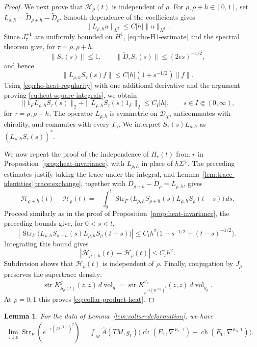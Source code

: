 \documentclass[12pt,reqno]{amsart}
\numberwithin{equation}{section}
\newtheorem{lemma}[theorem]{Lemma}
\theoremstyle{definition}
\newcommand{\Ahat}{\widehat A}
\newcommand{\ch}{\operatorname{ch}}
\newcommand{\Str}{\operatorname{Str}}
\newcommand{\str}{\operatorname{str}}
\begin{document}
\begin{proof}
We next prove that $\mathscr H_\rho(t)$ is independent of $\rho$.
For $\rho,\rho+h\in[0,1]$, set $L_{\rho,h}=\widetilde D_{\rho+h}-\widetilde D_\rho$.
Smooth dependence of the coefficients gives
\[
 \|L_{\rho,h}u\|_{L^2}
 \leq C|h|\|u\|_{H^1}.
\]
Since $J_\tau^{\pm1}$ are uniformly bounded on $H^1$,
\eqref{eq:rho-H1-estimate} and the spectral theorem give, for
$\tau=\rho,\rho+h$,
\[
 \|S_\tau(s)\|\leq1,\qquad
 \|\widetilde D_\tau S_\tau(s)\|
 \leq(2es)^{-1/2},
\]
and hence
\[
 \|L_{\rho,h}S_\tau(s)f\|
 \leq C|h|(1+s^{-1/2})\|f\|.
\]
Using \eqref{eq:rho-heat-regularity} with one additional derivative
and the argument proving \eqref{eq:heat-square-integrals}, we obtain
\[
 \|1_FL_{\rho,h}S_\tau(s)\|_2
 +\|L_{\rho,h}S_\tau(s)1_F\|_2
 \leq C_I|h|,
 \qquad s\in I\Subset(0,\infty),
\]
for $\tau=\rho,\rho+h$.  The operator $L_{\rho,h}$ is symmetric on
$\mathcal D_\chi$, anticommutes with chirality, and commutes with every
$T_\gamma$. We interpret $S_\tau(s)L_{\rho,h}$ as
$(L_{\rho,h}S_\tau(s))^*$.

We now repeat the proof of the independence of $H_r(t)$ from $r$ in
Proposition~\ref{prop:heat-invariance}, with $L_{\rho,h}$ in place of
$h\Sigma^\psi$.  The preceding estimates justify taking the trace
under the integral, and
Lemma~\ref{lem:trace-identities}\ref{trace:exchange}, together with
$\widetilde D_{\rho+h}-\widetilde D_\rho=L_{\rho,h}$, gives
\[
 \mathscr H_{\rho+h}(t)-\mathscr H_\rho(t)
 =-\int_0^t\Str_F\bigl(
 L_{\rho,h}S_{\rho+h}(s)L_{\rho,h}S_\rho(t-s)\bigr)\,ds.
\]
Proceed similarly as in the proof of Proposition~\ref{prop:heat-invariance}, the preceding bounds give, for $0<s<t$,
\[
 \left|\Str_F\bigl(
 L_{\rho,h}S_{\rho+h}(s)L_{\rho,h}S_\rho(t-s)\bigr)\right|
 \leq C_t h^2\bigl(1+s^{-1/2}+(t-s)^{-1/2}\bigr).
\]
Integrating this bound gives
\[
 |\mathscr H_{\rho+h}(t)-\mathscr H_\rho(t)|
 \leq C_t h^2.
\]
Subdivision shows that $\mathscr H_\rho(t)$ is independent of $\rho$.
Finally, conjugation by $J_\rho$ preserves the supertrace density:
\[
 \str K_{S_\rho(t)}^g(z,z)\,d\operatorname{vol}_g
 =\str K_{e^{-t(D^{(\rho)})^2}}^{g_\rho}(z,z)
       \,d\operatorname{vol}_{g_\rho}.
\]
At $\rho=0,1$ this proves \eqref{eq:collar-product-heat}.
\end{proof}

\begin{lemma}\label{lem:doubled-local-formula}
For the data of Lemma~\ref{lem:collar-deformation}, we have
\begin{equation}\label{eq:doubled-local-formula}
 \begin{aligned}
 \lim_{\tau\downarrow0}\Str_F(e^{-\tau(D^{(1)})^2})
=\int_M\Ahat(TM,g_1)
  \bigl(\ch(E_1,\nabla^{E_1,1})-\ch(E_0,\nabla^{E_0,1})\bigr).
 \end{aligned}
\end{equation}
\end{lemma}
\end{document}
